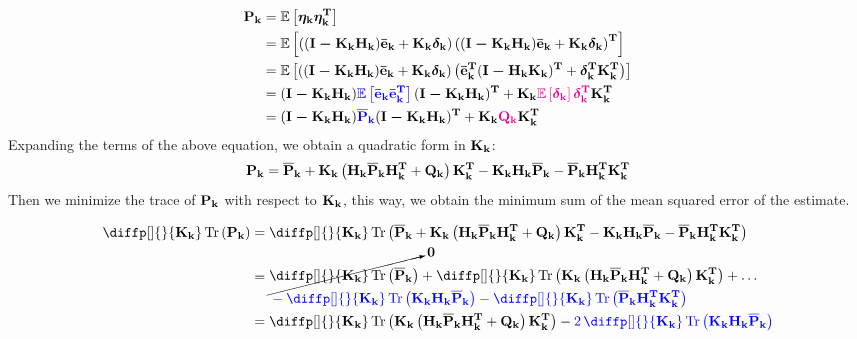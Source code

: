 \documentclass[12pt]{article}
\begin{document}
\begin{equation}
\begin{aligned}
    \boldsymbol{\mathbf{P_k}} &= \mathbb{E}\left[\boldsymbol{\mathbf{\eta_k}} 
        \boldsymbol{\mathbf{\eta_k^T}}\right]\\
    &= \mathbb{E}\left[\left((\boldsymbol{\mathbf{I - K_k H_k}})\boldsymbol{\mathbf{\bar{e}_k}}
    + \boldsymbol{\mathbf{K_k}}\boldsymbol{\mathbf{\delta_k}}\right) \left((\boldsymbol{\mathbf{I - K_k H_k}})
    \boldsymbol{\mathbf{\bar{e}_k}} 
    + \boldsymbol{\mathbf{K_k}}\boldsymbol{\mathbf{\delta_k}}\right)^\mathbf{T}\right]\\
    &= \mathbb{E}\left[\left((\boldsymbol{\mathbf{I - K_k H_k}})\boldsymbol{\mathbf{\bar{e}_k}}
    + \boldsymbol{\mathbf{K_k}}\boldsymbol{\mathbf{\delta_k}}\right) \left(\boldsymbol{\mathbf{\bar{e}_k^T}}
    (\boldsymbol{\mathbf{I - H_k K_k}})^\mathbf{T} 
    + \boldsymbol{\mathbf{\delta_k^T}}\boldsymbol{\mathbf{K_k^T}}\right)\right]\\
    &= (\boldsymbol{\mathbf{I - K_k H_k}})\color{blue}\mathbb{E}\left[\boldsymbol{\mathbf{\bar{e}_k}} 
    \boldsymbol{\mathbf{\bar{e}_k^T}}\right]\color{black}(\boldsymbol{\mathbf{I - K_k H_k}})^\mathbf{T} 
    + \boldsymbol{\mathbf{K_k}}\color{magenta}\mathbb{E}\left[\boldsymbol{\mathbf{\delta_k}}\right] \boldsymbol{\mathbf{\delta_k^T}}\color{black}\boldsymbol{\mathbf{K_k^T}}\\
    &= (\boldsymbol{\mathbf{I - K_k H_k}})\color{blue}\boldsymbol{\mathbf{\overline{P}_k}}\color{black}(\boldsymbol{\mathbf{I - K_k H_k}})^\mathbf{T} 
    + \boldsymbol{\mathbf{K_k}}\color{magenta}\boldsymbol{\mathbf{Q_k}}\color{black}\boldsymbol{\mathbf{K_k^T}}
\end{aligned}
\label{eq:ekf-estimate-error-covariance}
\end{equation}
Expanding the terms of the above equation, we obtain a quadratic form
in $\boldsymbol{\mathbf{K_k}}$:
\begin{equation}
    \boldsymbol{\mathbf{P_k}} = \boldsymbol{\mathbf{\overline{P}_k}} + \boldsymbol{\mathbf{K_k}}
    \left(\boldsymbol{\mathbf{H_k \overline{P}_k}}\boldsymbol{\mathbf{H_k^T}} + \boldsymbol{\mathbf{Q_k}}\right)
    \boldsymbol{\mathbf{K_k^T}} - \boldsymbol{\mathbf{K_k H_k \overline{P}_k}} 
    - \boldsymbol{\mathbf{\overline{P}_k H_k^T K_k^T}}
\end{equation}
Then we minimize the trace of $\boldsymbol{\mathbf{P_k}}$ with respect to 
$\boldsymbol{\mathbf{K_k}}$, this way, we obtain the minimum sum of the mean 
squared error of the estimate. 

\begin{equation}
\begin{aligned}
    \diffp[]{}{\mat{K_k}} \mytr{\mat{P_k}} &= 
    \diffp[]{}{\mat{K_k}} \Tr \parentheses{\mat{\overline{P}_k} 
    + \mat{K_k} \parentheses{\mat{H_k \overline{P}_k}\matT{H_k} 
    + \mat{Q_k}} \matT{K_k} - \mat{K_k H_k \overline{P}_k}
    - \mat{\overline{P}_k H_k^T K_k^T}}\\
    &= \begin{aligned}
        &\cancelto{\mat{0}}{ \diffp[]{}{\mat{K_k}}
        \mytr{\mat{\overline{P}_k}}} + \diffp[]{}{\mat{K_k}}\mytr{
        \mat{K_k} \parentheses{\mat{H_k \overline{P}_k}
        \matT{H_k} + \mat{Q_k}} \matT{K_k}} + \dots\\
        & \blue{-\diffp[]{}{\mat{K_k}} \mytr{\mat{K_k H_k 
        \overline{P}_k}} -\diffp[]{}{\mat{K_k}}\mytr{\mat{
        \mat{\overline{P}_k H_k^T K_k^T}}}}
    \end{aligned} \\
    &= \diffp[]{}{\mat{K_k}}\mytr{
        \mat{K_k} \parentheses{\mat{H_k \overline{P}_k}
        \matT{H_k} + \mat{Q_k}} \matT{K_k}} - \blue{2\,
        \diffp[]{}{\mat{K_k}} \mytr{\mat{K_k H_k\overline{P}_k}}}
\end{aligned}
\end{equation}
\end{document}
